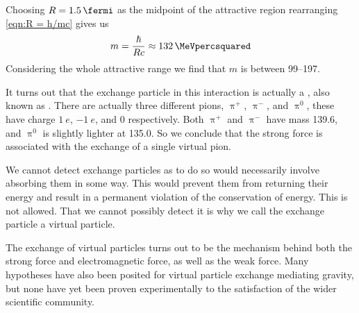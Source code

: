 \documentclass[fleqn]{NotesClass}
\makeatletter
\newcommand{\PBASE@pion}{\uppi}
\newcommand{\Ppion}{\ensuremath{\PBASE@pion}}
\newcommand{\Ppionp}{\ensuremath{\Ppion^+}}
\newcommand{\Ppionm}{\ensuremath{\Ppion^-}}
\newcommand{\Ppionzero}{\ensuremath{\Ppion^0}}
\newcommand{\Ppip}{\Ppionp}
\newcommand{\Ppim}{\Ppionm}
\newcommand{\Ppizero}{\Ppionzero}
\makeatother
\begin{document}
    Choosing \(R = \qty{1.5}{\fermi}\) as the midpoint of the attractive region rearranging \cref{eqn:R = h/mc} gives us
    \begin{equation}
        m = \frac{\hbar}{Rc} \approx \qty{132}{\MeVpercsquared}
    \end{equation}
    Considering the whole attractive range we find that \(m\) is between \qtyrange{99}{197}{\MeVpercsquared}.
    
    It turns out that the exchange particle in this interaction is actually a , also known as .
    There are actually three different pions, \Ppip, \Ppim, and \Ppizero, these have charge \(\qty{1}{\elementarycharge}\), \(\qty{-1}{\elementarycharge}\), and 0 respectively.
    Both \Ppip{} and \Ppim{} have mass \qty{139.6}{\MeVpercsquared}, and \Ppizero{} is slightly lighter at \qty{135.0}{\MeVpercsquared}.
    So we conclude that the strong force is associated with the exchange of a single virtual pion.
    
    We cannot detect exchange particles as to do so would necessarily involve absorbing them in some way.
    This would prevent them from returning their energy and result in a permanent violation of the conservation of energy.
    This is not allowed.
    That we cannot possibly detect it is why we call the exchange particle a virtual particle.
    
    The exchange of virtual particles turns out to be the mechanism behind both the strong force and electromagnetic force, as well as the weak force.
    Many hypotheses have also been posited for virtual particle exchange mediating gravity, but none have yet been proven experimentally to the satisfaction of the wider scientific community.
    
\end{document}

